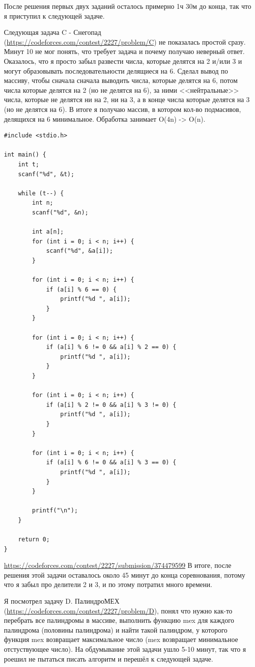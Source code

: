 \documentclass[oneside,a4paper,14pt]{extarticle} %
\begin{document}
  После решения первых двух заданий осталось примерно 1ч 30м до конца, так что я приступил к следующей задаче.
  \newpage

  Следующая задача C - Снегопад (\url{https://codeforces.com/contest/2227/problem/C}) не показалась простой сразу.
  Минут 10 не мог понять, что требует задача и почему получаю неверный ответ. Оказалось, что я просто забыл развести числа,
  которые делятся на 2 и/или 3 и могут образовывать последовательности делящиеся на 6. Сделал вывод по массиву, чтобы сначала 
  сначала выводить числа, которые делятся на 6, потом числа которые делятся на 2 (но не делятся на 6), за ними <<нейтральные>> числа,
  которые не делятся ни на 2, ни на 3, а в конце числа которые делятся на 3 (но не делятся на 6). В итоге я получаю массив, в котором
  кол-во подмасивов, делящихся на 6 минимальное. Обработка занимает O(4n) -> O(n).

  \begin{lstlisting}[caption={Решение задачи C - Снегопад}]
#include <stdio.h>

int main() {
	int t;
	scanf("%d", &t);
	
	while (t--) {
		int n;
		scanf("%d", &n);
		
		int a[n];
		for (int i = 0; i < n; i++) {
			scanf("%d", &a[i]);
		}

		for (int i = 0; i < n; i++) {
			if (a[i] % 6 == 0) {
				printf("%d ", a[i]);
			}
		}
		
		for (int i = 0; i < n; i++) {
			if (a[i] % 6 != 0 && a[i] % 2 == 0) {
				printf("%d ", a[i]);
			}
		}

		for (int i = 0; i < n; i++) {
			if (a[i] % 2 != 0 && a[i] % 3 != 0) {
				printf("%d ", a[i]);
			}
		}

		for (int i = 0; i < n; i++) {
			if (a[i] % 6 != 0 && a[i] % 3 == 0) {
				printf("%d ", a[i]);
			}
		}
		
		printf("\n");
	}
	
	return 0;
}
  \end{lstlisting}
  \url{https://codeforces.com/contest/2227/submission/374479599}
  В итоге, после решения этой задачи оставалось около 45 минут до конца соревнования,
  потому что я забыл про делители 2 и 3, и по этому потратил много времени.

  Я посмотрел задачу D. ПалиндроМЕХ (\url{https://codeforces.com/contest/2227/problem/D}), понял что нужно
  как-то перебрать все палиндромы в массиве, выполнить функцию mex для каждого палиндрома (половины палиндрома)
  и найти такой палиндром, у которого функция mex возвращает максимальное число (mex возвращает минимальное отстуствующее число).
  На обдумывание этой задачи ушло 5-10 минут, так что я роешил не пытаться писать алгоритм и перешёл к следующей задаче.
\end{document}
